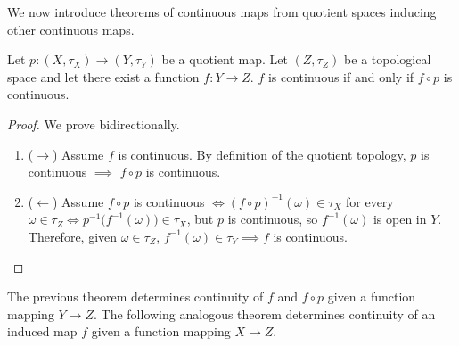     We now introduce theorems of continuous maps from quotient spaces inducing other continuous maps. 

    \begin{theorem}
      Let $p: (X, \tau_X) \rightarrow (Y, \tau_Y)$ be a quotient map. Let $(Z, \tau_Z)$ be a topological space and let there exist a function $f: Y \rightarrow Z$. $f$ is continuous if and only if $f \circ p$ is continuous. 

      \begin{figure}[H]
        \centering 
        \label{fig:decomposition_of_continuous}
      \end{figure}

    \end{theorem}
    \begin{proof}
      We prove bidirectionally. 
      \begin{enumerate}
        \item ($\rightarrow$) Assume $f$ is continuous. By definition of the quotient topology, $p$ is continuous $\implies$ $f \circ p$ is continuous. 
        \item ($\leftarrow$) Assume $f \circ p$ is continuous $\iff (f \circ p)^{-1} (\omega) \in \tau_X$ for every $\omega \in \tau_Z \iff p^{-1} \big( f^{-1}(\omega) \big) \in \tau_X$, but $p$ is continuous, so $f^{-1}(\omega)$ is open in $Y$. Therefore, given $\omega \in \tau_{Z}$, $f^{-1} (\omega) \in \tau_Y \implies f$ is continuous. 
      \end{enumerate}
    \end{proof}

    The previous theorem determines continuity of $f$ and $f \circ p$ given a function mapping $Y \rightarrow Z$. The following analogous theorem determines continuity of an induced map $f$ given a function mapping $X \rightarrow Z$. 

